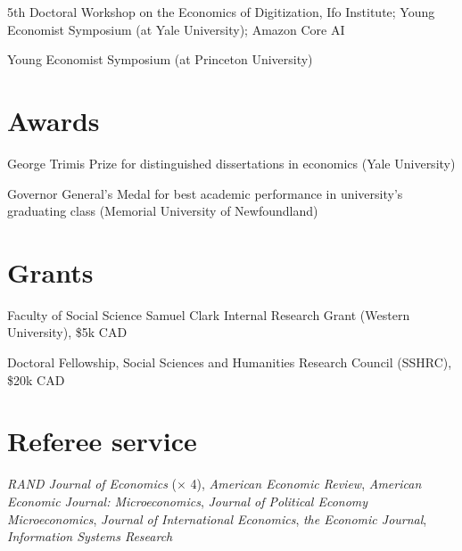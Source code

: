 \documentclass[11pt]{article} %
\begin{document}
 5th Doctoral Workshop on the Economics of Digitization, Ifo Institute; 
	Young Economist Symposium (at Yale University); Amazon Core AI


 Young Economist Symposium (at Princeton University)

\section*{Awards}

 George Trimis Prize for distinguished dissertations in economics (Yale University)

 Governor General's Medal for best academic performance in university's graduating class
	(Memorial University of Newfoundland)

\section*{Grants}

 Faculty of Social Science Samuel Clark Internal Research Grant (Western University), \$5k CAD

  Doctoral Fellowship, Social Sciences and Humanities Research Council (SSHRC), \$20k CAD


\section*{Referee service}

\textit{RAND Journal of Economics} ($\times$ 4), \textit{American Economic Review},
\textit{American Economic Journal: Microeconomics},
 \textit{Journal of Political Economy Microeconomics},
\textit{Journal of International Economics}, \textit{the Economic Journal},
\textit{Information Systems Research}


%
%
%
\end{document}
